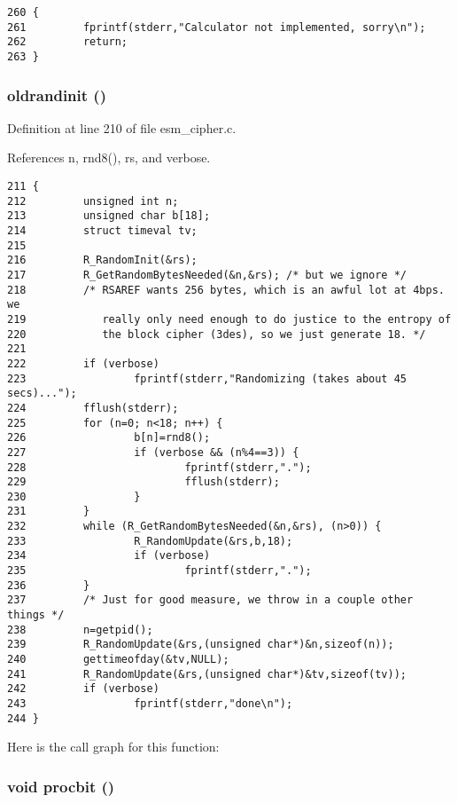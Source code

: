 \footnotesize\begin{verbatim}260 {
261         fprintf(stderr,"Calculator not implemented, sorry\n");
262         return;
263 }
\end{verbatim}\normalsize 
{}
\subsubsection{\setlength{\rightskip}{0pt plus 5cm}oldrandinit ()}\label{esm__cipher_8c_a36}




Definition at line 210 of file esm\_\-cipher.c.

References n, rnd8(), rs, and verbose.



\footnotesize\begin{verbatim}211 {
212         unsigned int n;
213         unsigned char b[18];
214         struct timeval tv;
215         
216         R_RandomInit(&rs);
217         R_GetRandomBytesNeeded(&n,&rs); /* but we ignore */
218         /* RSAREF wants 256 bytes, which is an awful lot at 4bps.  we
219            really only need enough to do justice to the entropy of
220            the block cipher (3des), so we just generate 18. */
221            
222         if (verbose)
223                 fprintf(stderr,"Randomizing (takes about 45 secs)...");
224         fflush(stderr);
225         for (n=0; n<18; n++) {
226                 b[n]=rnd8();
227                 if (verbose && (n%4==3)) {
228                         fprintf(stderr,".");
229                         fflush(stderr);
230                 }
231         }
232         while (R_GetRandomBytesNeeded(&n,&rs), (n>0)) {
233                 R_RandomUpdate(&rs,b,18);
234                 if (verbose)
235                         fprintf(stderr,".");
236         }
237         /* Just for good measure, we throw in a couple other things */
238         n=getpid();
239         R_RandomUpdate(&rs,(unsigned char*)&n,sizeof(n));
240         gettimeofday(&tv,NULL);
241         R_RandomUpdate(&rs,(unsigned char*)&tv,sizeof(tv));
242         if (verbose)
243                 fprintf(stderr,"done\n");
244 }
\end{verbatim}\normalsize 


Here is the call graph for this function:
\subsubsection{\setlength{\rightskip}{0pt plus 5cm}void procbit ()}\label{esm__cipher_8c_a33}




